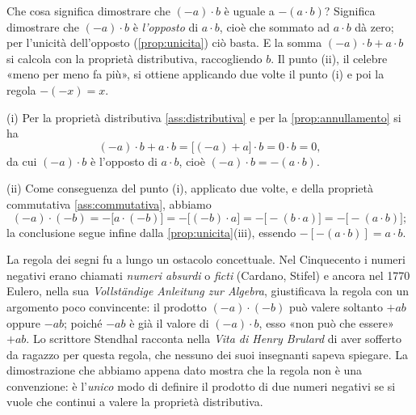 \begin{schema}
\end{schema}

\begin{strategia}
Che cosa significa dimostrare che $(-a)\cdot b$ è uguale a $-(a\cdot b)$? Significa
dimostrare che $(-a)\cdot b$ è \emph{l'opposto} di $a\cdot b$, cioè che sommato ad
$a\cdot b$ dà zero; per l'unicità dell'opposto (\cref{prop:unicita}) ciò basta. E la
somma $(-a)\cdot b+a\cdot b$ si calcola con la proprietà distributiva, raccogliendo
$b$. Il punto (ii), il celebre «meno per meno fa più», si ottiene applicando due
volte il punto (i) e poi la regola $-(-x)=x$.
\end{strategia}

\begin{dimostrazione}
(i) Per la proprietà distributiva \ref{ass:distributiva} e per la
\cref{prop:annullamento} si ha
\[
  (-a)\cdot b + a\cdot b = \bigl[(-a)+a\bigr]\cdot b = 0\cdot b = 0,
\]
da cui $(-a)\cdot b$ è l'opposto di $a\cdot b$, cioè $(-a)\cdot b=-(a\cdot b)$.

(ii) Come conseguenza del punto (i), applicato due volte, e della proprietà commutativa
\ref{ass:commutativa}, abbiamo
\[
  (-a)\cdot(-b) = -\bigl[a\cdot(-b)\bigr] = -\bigl[(-b)\cdot a\bigr]
  = -\bigl[-(b\cdot a)\bigr] = -\bigl[-(a\cdot b)\bigr];
\]
la conclusione segue infine dalla \cref{prop:unicita}(iii), essendo
$-[-(a\cdot b)]=a\cdot b$.
\end{dimostrazione}

\begin{notastorica}
La regola dei segni fu a lungo un ostacolo concettuale. Nel Cinquecento i numeri
negativi erano chiamati \emph{numeri absurdi} o \emph{ficti} (Cardano, Stifel) e ancora
nel 1770 Eulero, nella sua \emph{Vollständige Anleitung zur Algebra}, giustificava la
regola con un argomento poco convincente: il prodotto $(-a)\cdot(-b)$ può valere
soltanto $+ab$ oppure $-ab$; poiché $-ab$ è già il valore di $(-a)\cdot b$, esso «non
può che essere» $+ab$. Lo scrittore
Stendhal racconta nella \emph{Vita di Henry Brulard} di aver sofferto da ragazzo per
questa regola, che nessuno dei suoi insegnanti sapeva spiegare. La dimostrazione che
abbiamo appena dato mostra che la regola non è una convenzione: è l'\emph{unico} modo
di definire il prodotto di due numeri negativi se si vuole che continui a valere la
proprietà distributiva.
\end{notastorica}

